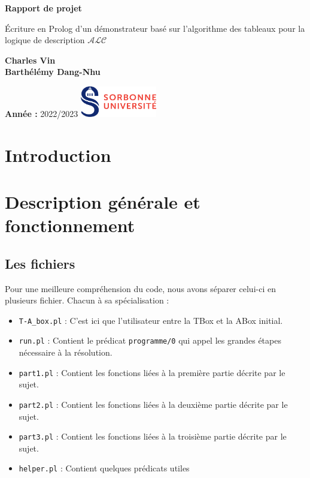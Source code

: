 \documentclass[12pt]{article}
\begin{document}
\begin{titlepage}
    \begin{center}
        \vspace*{1cm}

        \Huge
        \textbf{Rapport de projet}

        \vspace{0.5cm}
        \LARGE
        Écriture en Prolog d'un démonstrateur basé sur l'algorithme des tableaux pour la logique de description  $ \mathcal{ALC}$

        \vspace{1.5cm}

        \textbf{Charles Vin}\\
        \textbf{Barthélémy Dang-Nhu}

        \vfill



        \normalsize

        \textbf{Année :}
        2022/2023
        \hfill
        \includegraphics[width=0.25\textwidth]{./src/logo.png}
    \end{center}
\end{titlepage}

\tableofcontents
\newpage
\section{Introduction}

\section{Description générale et fonctionnement}
\subsection{Les fichiers}
Pour une meilleure compréhension du code, nous avons séparer celui-ci en plusieurs fichier. Chacun à sa spécialisation : \begin{itemize}
    \item \verb|T-A_box.pl| : C'est ici que l'utilisateur entre la TBox et la ABox initial.
    \item \verb|run.pl| : Contient le prédicat \verb|programme/0|  qui appel les grandes étapes nécessaire à la résolution.
    \item \verb|part1.pl| : Contient les fonctions liées à la première partie décrite par le sujet.
    \item \verb|part2.pl| : Contient les fonctions liées à la deuxième partie décrite par le sujet.
    \item \verb|part3.pl| : Contient les fonctions liées à la troisième partie décrite par le sujet.
    \item \verb|helper.pl| : Contient quelques prédicats utiles
\end{itemize}
\end{document}
